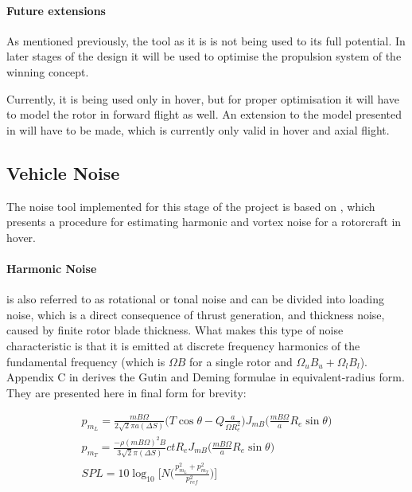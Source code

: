 

\paragraph{Future extensions}

As mentioned previously, the tool as it is is not being used to its full potential. In later stages of the design it will be used to optimise the propulsion system of the winning concept.

Currently, it is being used only in hover, but for proper optimisation it will have to model the rotor in forward flight as well. An extension to the model presented in \cite{BEMT} will have to be made, which is currently only valid in hover and axial flight.

 


\subsection{Vehicle Noise}

The noise tool implemented for this stage of the project is based on \cite{Brown2018}, which presents a procedure for estimating harmonic and vortex noise for a rotorcraft in hover.


\paragraph{Harmonic Noise} is also referred to as rotational or tonal noise and can be divided into loading noise, which is a direct consequence of thrust generation, and thickness noise, caused by finite rotor blade thickness. What makes this type of noise characteristic is that it is emitted at discrete frequency harmonics of the fundamental frequency (which is $\Omega B$ for a single rotor and $\Omega_u B_u+ \Omega_l B_l$). Appendix C in \cite{Brown2018} derives the Gutin and Deming formulae in equivalent-radius form. They are presented here in final form for brevity:

\begin{align}
    p_{m_L} = \frac{mB\Omega}{2\sqrt{2}\pi a (\Delta S)} \Big(T \cos \theta - Q \frac{a}{\Omega R_e^2} \Big) J_{mB}\Big(\frac{m B \Omega}{a} R_e \sin \theta \Big) \\
    p_{m_T} = \frac{-\rho (m B \Omega)^2 B}{3 \sqrt{2} \pi (\Delta S)} c t R_e J_{mB} \Big(\frac{m B \Omega}{a} R_e \sin \theta \Big) \\
    SPL = 10 \log_{10} \Bigg[ N \bigg( \frac{p_{m_L}^2+p_{m_T}^2}{p_{ref}^2} \bigg) \Bigg]
\end{align}

